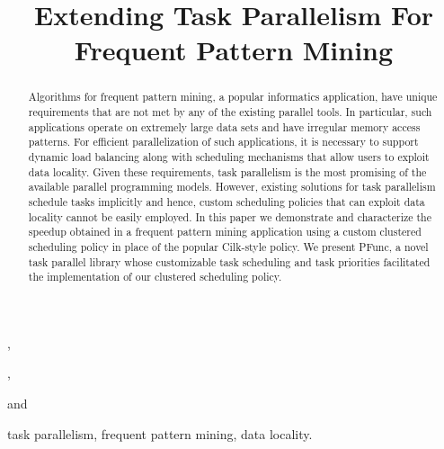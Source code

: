 \documentclass{IOS-Book-Article}
\begin{document}
\begin{frontmatter}                           %

\title{Extending Task Parallelism For Frequent Pattern Mining}

\author[A]{},
\author[B]{},
\author[B]{} and
\author[A]{}

\address[A]{Open Systems Lab, Indiana University, Bloomington, IN - 47408}
\address[B]{IBM T J Watson Research Center, Yorktown Heights, NY - 10598}

\begin{abstract}
Algorithms for frequent pattern mining, a popular informatics application,
have unique requirements that are not met by any of the existing parallel 
tools. In particular, such applications operate on extremely large data
sets and have irregular memory access patterns. For efficient parallelization
of such applications, it is necessary to support dynamic load balancing
along with scheduling mechanisms that allow users to exploit data locality.  
Given these requirements, task parallelism is the most promising of the
available parallel programming models.  However, existing solutions for task
parallelism schedule tasks implicitly and hence, custom scheduling policies
that can exploit data locality cannot be easily employed.
In this paper we demonstrate and characterize the speedup obtained in a
frequent pattern mining application using a custom clustered scheduling
policy in place of the popular Cilk-style policy.  We present PFunc, a novel
task parallel library whose customizable task scheduling and task priorities
facilitated the implementation of our clustered scheduling policy.
\end{abstract}

\begin{keyword}
task parallelism, frequent pattern mining, data locality.
\end{keyword}

\end{frontmatter}
\end{document}
